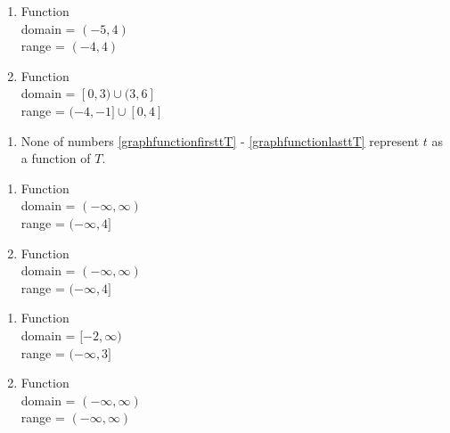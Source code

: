 \documentclass{ximera}
\begin{document}
\begin{enumerate}

\item Function \\  domain =  $(-5, 4)$ \\ range = $(-4, 4)$

 

 

\item  Function \\ domain = $[0,3) \cup (3,6]$ \\ range = $(-4,-1] \cup [0,4]$

\end{enumerate}



\begin{enumerate}

\item None of numbers \ref{graphfunctionfirsttT} - \ref{graphfunctionlasttT}  represent $t$ as a function of $T$.

\end{enumerate}



\begin{enumerate}

\item  Function \\ domain = $(-\infty, \infty)$ \\ range = $(-\infty, 4]$

 

 

\item  Function \\ domain = $(-\infty, \infty)$ \\ range = $(-\infty, 4]$

\end{enumerate}



\begin{enumerate}

\item  Function \\  domain =  $[-2, \infty)$  \\ range =   $(-\infty, 3]$

 

 

\item  Function \\ domain = $(-\infty, \infty)$ \\ range = $(-\infty, \infty)$

\end{enumerate}
\end{document}
